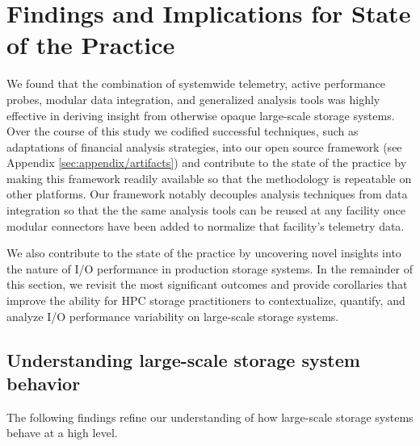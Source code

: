 \section{Findings and Implications for State of the Practice}
\label{sec:findings}

We found that the combination of systemwide telemetry, active performance
probes, modular data integration, and generalized analysis
tools was highly effective in deriving insight from otherwise
opaque large-scale storage systems.  Over the course of this study we
codified successful techniques, such as adaptations of financial analysis
strategies, into our open source \tokio framework
(see Appendix \ref{sec:appendix/artifacts}) and contribute to the state of
the practice by making this framework
readily available so that the methodology is repeatable on other platforms.  Our framework notably
decouples analysis techniques from data integration so that the
the same analysis tools can be reused at any facility once modular
connectors have been added to normalize that facility's telemetry data.

We also contribute to the state of the practice by uncovering novel
insights into the nature of I/O performance in production storage systems.
In the remainder of this section, we revisit the most significant outcomes and
provide corollaries that improve the ability for HPC storage practitioners
to contextualize, quantify, and analyze I/O performance variability on
large-scale storage systems.

\subsection{Understanding large-scale storage system behavior}

The following findings  refine our understanding of how large-scale storage
systems behave at a high level. 

